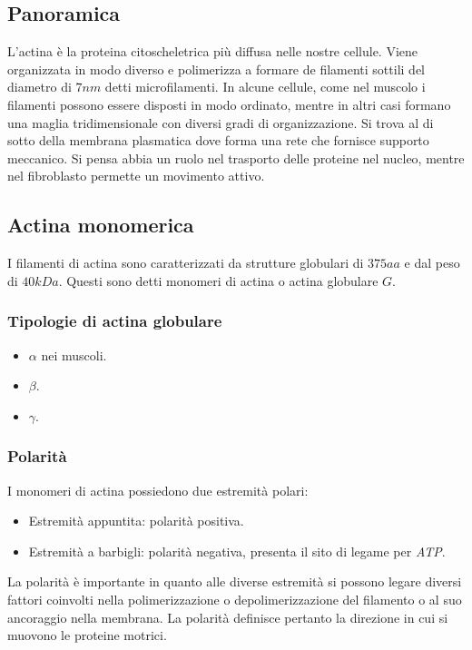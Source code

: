 	\subsection{Panoramica}
	L'actina \`e la proteina citoscheletrica pi\`u diffusa nelle nostre cellule.
	Viene organizzata in modo diverso e polimerizza a formare de filamenti sottili del diametro di $7nm$ detti microfilamenti.
	In alcune cellule, come nel muscolo i filamenti possono essere disposti in modo ordinato, mentre in altri casi formano una maglia tridimensionale con diversi gradi di organizzazione.
	Si trova al di sotto della membrana plasmatica dove forma una rete che fornisce supporto meccanico.
	Si pensa abbia un ruolo nel trasporto delle proteine nel nucleo, mentre nel fibroblasto permette un movimento attivo.

	\subsection{Actina monomerica}
	I filamenti di actina sono caratterizzati da strutture globulari di $375aa$ e dal peso di $40kDa$.
	Questi sono detti monomeri di actina o actina globulare $G$.

		\subsubsection{Tipologie di actina globulare}
		\begin{multicols}{3}
			\begin{itemize}
				\item $\alpha$ nei muscoli.
				\item $\beta$.
				\item $\gamma$.
			\end{itemize}
		\end{multicols}

		\subsubsection{Polarit\`a}
		I monomeri di actina possiedono due estremit\`a polari:
		\begin{multicols}{2}
			\begin{itemize}
				\item Estremit\`a appuntita: polarit\`a positiva.
				\item Estremit\`a a barbigli: polarit\`a negativa, presenta il sito di legame per \emph{ATP}.
			\end{itemize}
		\end{multicols}
		La polarit\`a \`e importante in quanto alle diverse estremit\`a si possono legare diversi fattori coinvolti nella polimerizzazione o depolimerizzazione del filamento o al suo ancoraggio nella membrana.
		La polarit\`a definisce pertanto la direzione in cui si muovono le proteine motrici.

